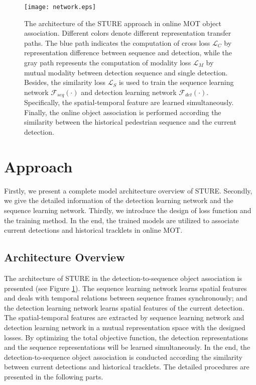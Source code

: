 \documentclass[times,twocolumn,final,authoryear]{elsarticle}
\begin{document}
\begin{figure}[!ht]
	\centering
	\texttt{[image: network.eps]}
	\caption{The architecture of the STURE approach in online MOT object association.
		Different colors denote different representation transfer paths.
		The blue path indicates the computation of cross loss $\mathcal{L}_C$ by representation difference between sequence and detection, 
		while the gray path represents the computation of modality loss $\mathcal{L}_M$ by mutual modality between detection sequence and single detection.
		Besides, the similarity loss $\mathcal{L}_S$ {is} used to train the sequence learning network $\mathcal{F}_{seq}(\cdot)$ and detection learning network $\mathcal{F}_{det}(\cdot)$.
		Specifically, the spatial-temporal feature are learned simultaneously.
		Finally, the online object association is performed according the similarity between the historical pedestrian sequence and the current detection.}
	\label{fig:network_architecture}
\end{figure}



\section{Approach}
Firstly, we present a complete model architecture overview of STURE.
Secondly, we give the detailed information of the detection learning network and the sequence learning network. 
Thirdly, we introduce the design of loss function and the training method.
In the end, the trained models are utilized to associate current {detections} and historical tracklets in online MOT. 

\subsection{Architecture Overview}
The architecture of STURE in the detection-to-sequence object association is presented (see Figure \ref{fig:network_architecture}). 
The sequence learning network learns spatial features and deals with temporal relations between sequence frames synchronously; 
and the detection learning network learns spatial features of the current detection. 
The spatial-temporal features are extracted by sequence learning network and detection learning network in a mutual representation space with the designed losses. 
By optimizing the total objective function, the detection representations and the sequence representations will be learned simultaneously. 
In the end, the detection-to-sequence object association is conducted according the similarity between {current detections and historical tracklets}.  
The detailed procedures are presented in the following parts.
\end{document}
